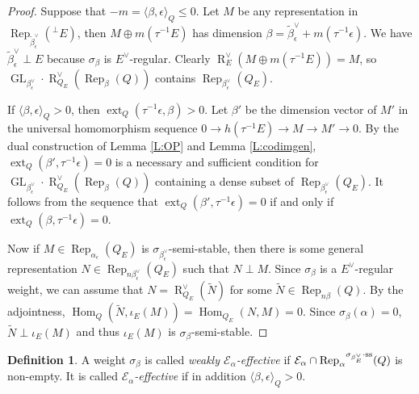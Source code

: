 \documentclass{amsart}
\theoremstyle{definition}
\newtheorem{definition}[theorem]{Definition}
\theoremstyle{remark}
\numberwithin{equation}{section}
\begin{document}
\begin{proof} Suppose that $-m={\langle{\beta,\epsilon}\rangle}_Q\leqslant 0$. Let $M$ be any representation in ${\operatorname{Rep}}_{\tilde{\beta}_\epsilon^\vee}({{^\perp}\!} E)$, then $M\oplus m(\tau^{-1} E)$ has dimension $\beta=\tilde{\beta}_\epsilon^\vee+m(\tau^{-1}\epsilon)$. We have $\tilde{\beta}_\epsilon^\vee\perp E$ because $\sigma_\beta$ is $E^\vee$-regular. Clearly ${\operatorname{R}}_E^\vee(M\oplus m(\tau^{-1} E))=M$, so ${\operatorname{GL}}_{\beta_\epsilon^\vee}\cdot{\operatorname{R}}_{Q_E}^\vee({\operatorname{Rep}}_\beta(Q))$ contains ${\operatorname{Rep}}_{\beta_\epsilon^\vee}(Q_E)$.

If ${\langle{\beta,\epsilon}\rangle}_Q>0$, then ${\operatorname{ext}}_Q(\tau^{-1}\epsilon,\beta)>0$.
Let $\beta'$ be the dimension vector of $M'$ in the universal homomorphism sequence $0\to h(\tau^{-1}E) \to M \to M'\to 0$. By the dual construction of Lemma \ref{L:OP} and Lemma \ref{L:codimgen},
${\operatorname{ext}}_Q(\beta',\tau^{-1}\epsilon)=0$ is a necessary and sufficient condition for ${\operatorname{GL}}_{\beta_\epsilon^\vee}\cdot{\operatorname{R}}_{Q_E}^\vee({\operatorname{Rep}}_\beta(Q))$ containing a dense subset of ${\operatorname{Rep}}_{\beta_\epsilon^\vee}(Q_E)$. It follows from the sequence that ${\operatorname{ext}}_Q(\beta',\tau^{-1}\epsilon)=0$ if and only if ${\operatorname{ext}}_Q(\beta,\tau^{-1}\epsilon)=0$.

Now if $M\in{\operatorname{Rep}}_{\alpha_\epsilon}(Q_E)$ is $\sigma_{\beta_\epsilon^\vee}$-semi-stable, then there is some general representation $N\in{\operatorname{Rep}}_{n\beta_\epsilon^\vee}(Q_E)$ such that $N\perp M$. Since $\sigma_\beta$ is a $E^\vee$-regular weight, we can assume that $N={\operatorname{R}}_{Q_E}^\vee(\tilde{N})$ for some $\tilde{N}\in{\operatorname{Rep}}_{n\beta}(Q)$. By the adjointness, ${\operatorname{Hom}}_Q(\tilde{N},\iota_E(M))={\operatorname{Hom}}_{Q_E}(N,M)=0$. Since $\sigma_\beta(\alpha)=0$, $\tilde{N}\perp\iota_E(M)$ and thus $\iota_E(M)$ is $\sigma_\beta$-semi-stable.
\end{proof}

\begin{definition} A weight $\sigma_\beta$ is called {\em weakly ${\mathcal{{E}}}_\alpha$-effective} if ${\mathcal{{E}}}_\alpha\cap{\operatorname{Rep}}_\alpha{^{\sigma_{{\beta_E^\vee}}\cdot{\rm {ss}}}}(Q)$ is non-empty. It is called {\em ${\mathcal{{E}}}_\alpha$-effective} if in addition ${\langle{\beta,\epsilon}\rangle}_Q>0$.
\end{definition}
\end{document}
